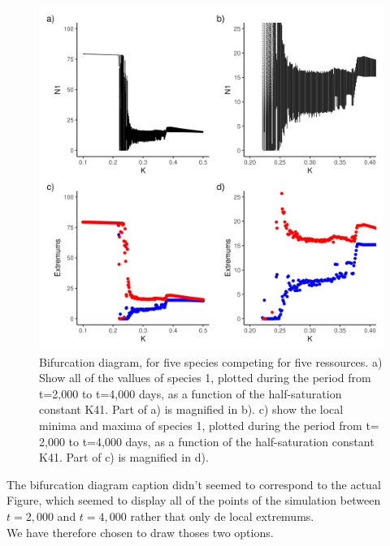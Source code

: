 \begin{figure}[H]
\begin{center} 
 \includegraphics[width=1\textwidth]{../Code/Figures/Figure_3.png}
  \caption{Bifurcation diagram, for five species competing for five ressources. a) Show all of the vallues of species 1, plotted during the period from t=2,000 to t=4,000 days, as a function of the half-saturation constant K41. Part of a) is magnified in b). c) show the local minima and maxima of species 1, plotted during the period from t= 2,000 to t=4,000 days, as a function of the half-saturation constant K41. Part of c) is magnified in d).}
  \label{figures:Fig3}
\end{center}
\end{figure}
The bifurcation diagram caption didn't seemed to correspond to the actual Figure, which seemed to display all of the points of the simulation between $t=2,000$ and $t=4,000$ rather that only de local extremums.\\
We have therefore chosen to draw thoses two options. 

